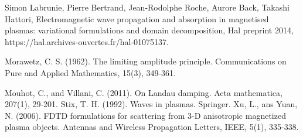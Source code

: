 \documentclass[proc]{edpsmath}
\begin{document}
\begin{thebibliography}{99}
Simon Labrunie, Pierre Bertrand, Jean-Rodolphe Roche, Aurore Back,
Takashi Hattori, 
Electromagnetic wave propagation and absorption in
magnetised plasmas: variational formulations and
domain decomposition, Hal preprint 2014, https://hal.archives-ouvertes.fr/hal-01075137.




 Morawetz, C. S. (1962). The limiting amplitude principle. Communications on Pure and Applied Mathematics, 15(3), 349-361.

 Mouhot, C., and Villani, C. (2011). On Landau damping. Acta mathematica, 207(1), 29-201.
 Stix, T. H. (1992). Waves in plasmas. Springer.
Xu, L., ans Yuan, N. (2006). FDTD formulations for scattering from 3-D anisotropic magnetized plasma objects. Antennas and Wireless Propagation Letters, IEEE, 5(1), 335-338.
\end{thebibliography}
\end{document}
